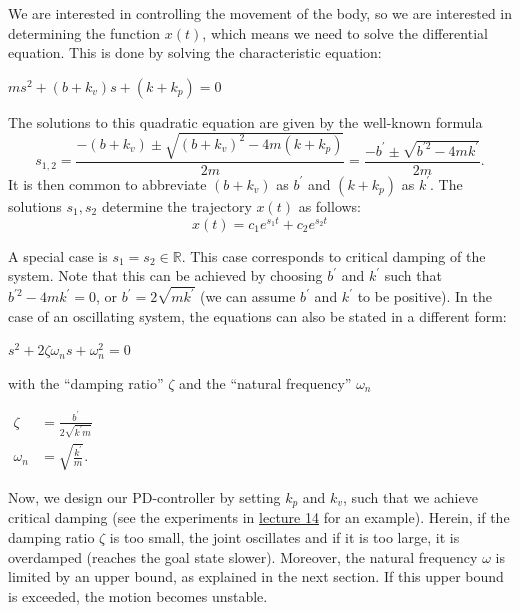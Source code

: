We are interested in controlling the movement of the body, so we are interested in determining the function $x(t)$, which means we need to solve the differential equation. This is done by solving the characteristic equation:

\begin{center}
$m s^{2}+\left(b+k_{v}\right) s+\left(k+k_{p}\right)=0$	
\end{center}

The solutions to this quadratic equation are given by the well-known formula
$$
s_{1,2}=\frac{-\left(b+k_{v}\right) \pm \sqrt{\left(b+k_{v}\right)^{2}-4 m\left(k+k_{p}\right)}}{2 m}=\frac{-b^{\prime} \pm \sqrt{b^{\prime 2}-4 m k^{\prime}}}{2 m} .
$$
It is then common to abbreviate $\left(b+k_{v}\right)$ as $b^{\prime}$ and $\left(k+k_{p}\right)$ as $k^{\prime}$. The solutions $s_{1}, s_{2}$ determine the trajectory $x(t)$ as follows:
$$
x(t)=c_{1} e^{s_{1} t}+c_{2} e^{s_{2} t}
$$

A special case is $s_{1}=s_{2} \in \mathbb{R}$. This case corresponds to critical damping of the system. Note that this can be achieved by choosing $b^{\prime}$ and $k^{\prime}$ such that $b^{\prime 2}-4 m k^{\prime}=0$, or $b^{\prime}=2 \sqrt{m k^{\prime}}$ (we can assume $b^{\prime}$ and $k^{\prime}$ to be positive). In the case of an oscillating system, the equations can also be stated in a different form:

\begin{center}
$s^{2}+2 \zeta \omega_{n} s+\omega_{n}^{2}=0$
\end{center}

with the ``damping ratio'' $\zeta$ and the ``natural frequency'' $\omega_{n}$
 
\begin{center}
$
\begin{aligned}
\zeta &=\frac{b^{\prime}}{2 \sqrt{k^{\prime} m}} \\
\omega_{n} &=\sqrt{\frac{k^{\prime}}{m}}.
\end{aligned}
$
\end{center}

Now, we design our PD-controller by setting $k_p$ and $k_v$, such that we achieve critical damping (see the experiments in \href{https://www.youtube.com/watch?v=U3diaQ-iU0I&list=PL65CC0384A1798ADF&index=16}{lecture 14} for an example). Herein, if the damping ratio $\zeta$ is too small, the joint oscillates and if it is too large, it is overdamped (reaches the goal state slower). Moreover, the natural frequency $\omega$ is limited by an upper bound, as explained in the next section. If this upper bound is exceeded, the motion becomes unstable.

